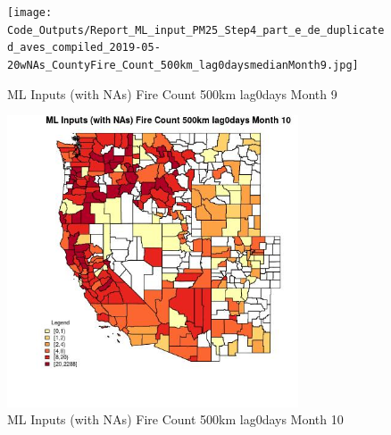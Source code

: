 \begin{figure} 
\centering  
\texttt{[image: Code\_Outputs/Report\_ML\_input\_PM25\_Step4\_part\_e\_de\_duplicated\_aves\_compiled\_2019-05-20wNAs\_CountyFire\_Count\_500km\_lag0daysmedianMonth9.jpg]} 
\caption{\label{fig:Report_ML_input_PM25_Step4_part_e_de_duplicated_aves_compiled_2019-05-20wNAsCountyFire_Count_500km_lag0daysmedianMonth9}ML Inputs (with NAs) Fire Count 500km lag0days Month 9} 
\end{figure} 
 

\begin{figure} 
\centering  
\includegraphics[width=0.77\textwidth]{Code_Outputs/Report_ML_input_PM25_Step4_part_e_de_duplicated_aves_compiled_2019-05-20wNAs_CountyFire_Count_500km_lag0daysmedianMonth10.jpg} 
\caption{\label{fig:Report_ML_input_PM25_Step4_part_e_de_duplicated_aves_compiled_2019-05-20wNAsCountyFire_Count_500km_lag0daysmedianMonth10}ML Inputs (with NAs) Fire Count 500km lag0days Month 10} 
\end{figure} 
 

